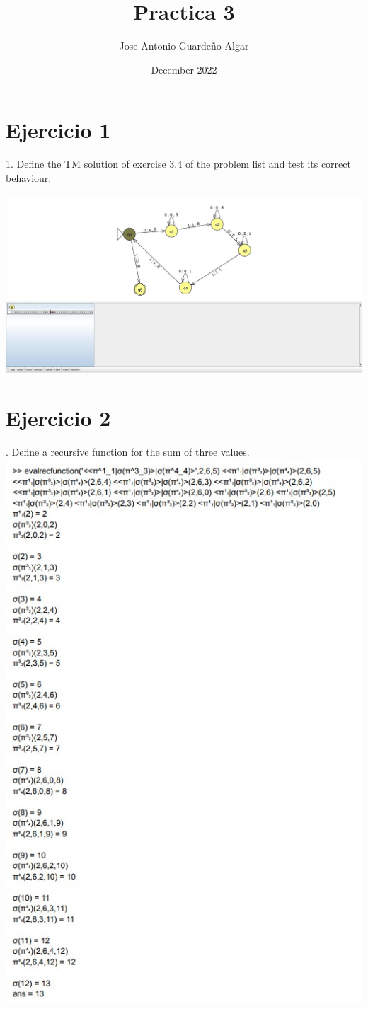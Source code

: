\documentclass{article}
\title{Practica 3}
\author{Jose Antonio Guardeño Algar}
\date{December 2022}
\begin{document}
\maketitle
\section{Ejercicio 1}
1. Define the TM solution of exercise 3.4 of the problem list and test its correct
behaviour.

\includegraphics[width=15cm]{Practica31.jpg}
\section{Ejercicio 2}
. Define a recursive function for the sum of three values.
\newline
\includegraphics{practica32pd.jpg}
\end{document}
